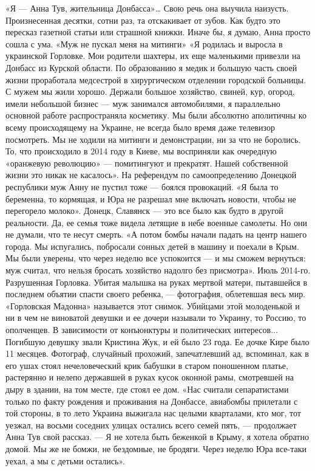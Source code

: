 «Я — Анна Тув, жительница Донбасса»… Свою речь она выучила наизусть. Произнесенная десятки, сотни раз, та отскакивает от зубов. Как будто это пересказ газетной статьи или страшной книжки. Иначе бы, я думаю, Анна просто сошла с ума.
«Муж не пускал меня на митинги»
«Я родилась и выросла в украинской Горловке. Мои родители шахтеры, их еще маленькими привезли на Донбасс из Курской области. По образованию я медик и большую часть своей жизни проработала медсестрой в хирургическом отделении городской больницы.
С мужем мы жили хорошо. Держали большое хозяйство, свиней, кур, огород, имели небольшой бизнес — муж занимался автомобилями, я параллельно основной работе распространяла косметику.
Мы были абсолютно аполитичны ко всему происходящему на Украине, не всегда было время даже телевизор посмотреть. Мы не ходили на митинги и демонстрации, ни за что не боролись. То, что происходило в 2014 году в Киеве, мы восприняли как очередную «оранжевую революцию» — помитингуют и прекратят. Нашей собственной жизни это никак не касалось».
На референдум по самоопределению Донецкой республики муж Анну не пустил тоже — боялся провокаций.
«Я была то беременна, то кормящая, и Юра не разрешал мне включать новости, чтобы не перегорело молоко».
Донецк, Славянск — это все было как будто в другой реальности. Да, ее семья тоже видела летящие в небе военные самолеты. Но они не думали, что те несут смерть.
«А потом бомбы начали падать на центр нашего города. Мы испугались, побросали сонных детей в машину и поехали в Крым. Мы были уверены, что через неделю все успокоится — и мы сможем вернуться: муж считал, что нельзя бросать хозяйство надолго без присмотра».
Июль 2014-го. Разрушенная Горловка. Убитая малышка на руках мертвой матери, пытавшейся в последнем объятии спасти своего ребенка, — фотография, облетевшая весь мир. «Горловская Мадонна» называется этот снимок. Убийцами этой молоденькой и ни в чем не виноватой девушки и ее дочери называли то Украину, то Россию, то ополченцев. В зависимости от конъюнктуры и политических интересов...
Погибшую девушку звали Кристина Жук, и ей было 23 года. Ее дочке Кире было 11 месяцев. Фотограф, случайный прохожий, запечатлевший ад, вспоминал, как в его ушах стоял нечеловеческий крик бабушки в старом поношенном платье, растерянно и нелепо державшей в руках кусок оконной рамы, смотревшей на дыру в здании, на том месте, где стоял ее дом.
«Нас считали сепаратистами только по факту рождения и проживания на Донбассе, авиабомбы прилетали с той стороны, в то лето Украина выжигала нас целыми кварталами, кто мог, тот уезжал, на восьми соседних улицах остались всего семей пять, — продолжает Анна Тув свой рассказ. — Я не хотела быть беженкой в Крыму, я хотела обратно домой. Мы же не бомжи, не бездомные, не бродяги. Через неделю Юра все-таки уехал, а мы с детьми остались».
